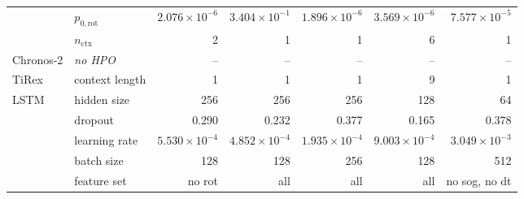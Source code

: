 \begin{table}[t]
\begin{tabular}{llrrrrr}
               & $p_{0,\text{rot}}$    & $2.076 \times 10^{-6}$ & $3.404 \times 10^{-1}$ & $1.896 \times 10^{-6}$ & $3.569 \times 10^{-6}$ & $7.577 \times 10^{-5}$ \\
               & $n_\text{ctx}$        & 2                      & 1                      & 1                      & \cellcolor{cyan!15}6   & 1                      \\
\midrule
Chronos-2      & \textit{no HPO}        & --     & --     & --     & --     & --    \\
TiRex          & context length        & 1      & 1      & 1      & \cellcolor{cyan!15}9      & 1     \\
\midrule
LSTM           & hidden size           & 256   & 256   & 256   & 128   & \cellcolor{orange!15}64   \\
               & dropout               & 0.290 & 0.232 & 0.377 & 0.165 & 0.378 \\
               & learning rate         & $5.530 \times 10^{-4}$ & $4.852 \times 10^{-4}$ & $1.935 \times 10^{-4}$ & $9.003 \times 10^{-4}$ & $3.049 \times 10^{-3}$ \\
               & batch size            & 128   & 128   & 256   & 128   & \cellcolor{orange!15}512   \\
               & feature set           & no rot   & all   & all   & all   & \cellcolor{orange!15}no sog, no dt \\
\bottomrule
\end{tabular}
\end{table}

